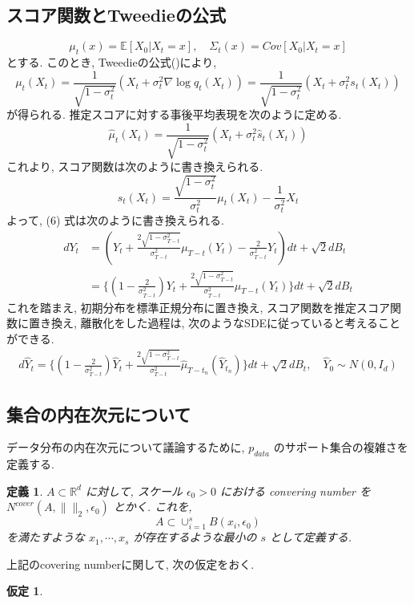 \documentclass[11pt,a4paper]{ltjsarticle}
\newtheorem{definition}{定義}[section]
\newtheorem{assumption}[theorem]{仮定}
\theoremstyle{remark}
\begin{document}
\subsection{スコア関数とTweedieの公式}
\begin{equation}
    \mu_t(x)=\mathbb{E}[X_0|X_t=x], \quad \Sigma_t(x)=Cov[X_0|X_t=x]
\end{equation}
とする. このとき, Tweedieの公式(\cite{efron2011})により, 
\begin{equation}
    \mu_t(X_t)=\frac{1}{\sqrt{1-\sigma^2_t}}(X_t+\sigma^2_t\nabla \log{q_t(X_t)})=\frac{1}{\sqrt{1-\sigma^2_t}}(X_t+\sigma^2_ts_t(X_t))
\end{equation}
が得られる.
推定スコアに対する事後平均表現を次のように定める.
\begin{equation}
    \hat{\mu}_t(X_t)=\frac{1}{\sqrt{1-\sigma^2_t}}(X_t+\sigma^2_t\hat{s}_t(X_t))
\end{equation}
これより, スコア関数は次のように書き換えられる.
\begin{equation}
    s_t(X_t)=\frac{\sqrt{1-\sigma^2_t}}{\sigma^2_t}\mu_t(X_t)-\frac{1}{\sigma^2_t}X_t
\end{equation}
よって, (6) 式は次のように書き換えられる.
\begin{align}
    dY_t&=(Y_t+\frac{2\sqrt{1-\sigma^2_{T-t}}}{\sigma^2_{T-t}}\mu_{T-t}(Y_t)-\frac{2}{\sigma^2_{T-t}}Y_t)dt+\sqrt{2}dB_t\\
    &=\{(1-\frac{2}{\sigma^2_{T-t}})Y_t+\frac{2\sqrt{1-\sigma^2_{T-t}}}{\sigma^2_{T-t}}\mu_{T-t}(Y_t)\}dt+\sqrt{2}dB_t
\end{align}
これを踏まえ, 初期分布を標準正規分布に置き換え, スコア関数を推定スコア関数に置き換え, 離散化をした過程は, 次のようなSDEに従っていると考えることができる.
\begin{align}
    d\hat{Y}_t=\{(1-\frac{2}{\sigma^2_{T-t}})\hat{Y}_t+\frac{2\sqrt{1-\sigma^2_{T-t}}}{\sigma^2_{T-t}}\hat{\mu}_{T-t_n}(\hat{Y}_{t_n})\}dt+\sqrt{2}dB_t, \quad \hat{Y}_0\sim N(0,I_d)
\end{align}
\subsection{集合の内在次元について}
データ分布の内在次元について議論するために, $p_{data}$ のサポート集合の複雑さを定義する.
\begin{definition}
    $A\subset \mathbb{R}^d$ に対して, スケール $\epsilon_0>0$ における convering number を$N^{cover}(A,\|\|_2,\epsilon_0)$ とかく.
    これを, 
    \begin{equation}
        A\subset \cup_{i=1}^sB(x_i,\epsilon_0)
    \end{equation}
    を満たすような $x_1,\cdots, x_s$ が存在するような最小の $s$ として定義する.
\end{definition}
上記のcovering numberに関して, 次の仮定をおく.
\begin{assumption}
    
\end{assumption}
\end{document}
